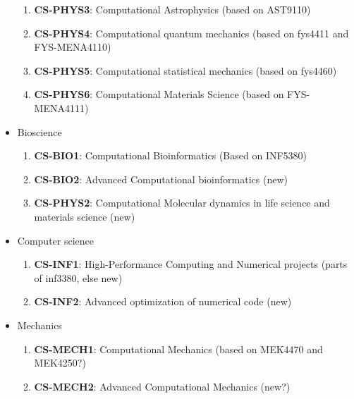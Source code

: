 \documentclass[%
oneside,                 %
final,                   %
10pt]{article}
\begin{document}
\begin{itemize}
\begin{enumerate}
\item \textbf{CS-PHYS3}: Computational Astrophysics (based on AST9110)

\item \textbf{CS-PHYS4}: Computational quantum mechanics (based on fys4411 and FYS-MENA4110)

\item \textbf{CS-PHYS5}: Computational statistical mechanics (based on fys4460)

\item \textbf{CS-PHYS6}: Computational Materials Science (based on FYS-MENA4111)

\end{enumerate}

\noindent
\item Bioscience
\begin{enumerate}

\item \textbf{CS-BIO1}: Computational Bioinformatics (Based on INF5380)

\item \textbf{CS-BIO2}: Advanced Computational bioinformatics (new)

\item \textbf{CS-PHYS2}: Computational Molecular dynamics in life science and materials science (new)

\end{enumerate}

\noindent
\item Computer science
\begin{enumerate}

\item \textbf{CS-INF1}: High-Performance Computing and Numerical projects (parts of inf3380, else new)

\item \textbf{CS-INF2}: Advanced optimization of numerical code (new)

\end{enumerate}

\noindent
\item Mechanics
\begin{enumerate}

\item \textbf{CS-MECH1}: Computational Mechanics (based on MEK4470 and MEK4250?)

\item \textbf{CS-MECH2}: Advanced Computational Mechanics (new?)
\end{enumerate}

\noindent
\end{itemize}
\end{document}

